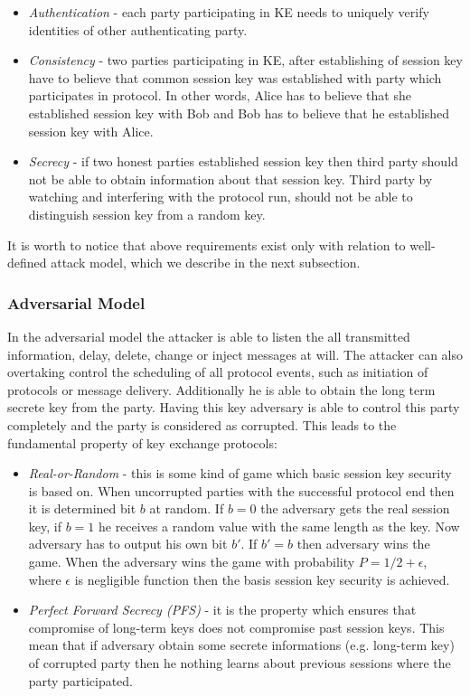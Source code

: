 \documentclass[11pt,titlepage]{article}
\theoremstyle{plain}
\begin{document}
\begin{itemize}
	\item \textit{Authentication} - each party participating in KE needs to uniquely verify identities of other authenticating party.
	\item \textit{Consistency} - two parties participating in KE, after establishing of session key have to believe that common session key was established with party which participates in protocol. In other words, Alice has to believe that she established session key with Bob and Bob has to believe that he established session key with Alice.
	\item \textit{Secrecy} - if two honest parties established session key then third party should not be able to obtain information about that session key. Third party by watching and interfering with the protocol run, should not be able to distinguish session key from a random key.
\end{itemize}

It is worth to notice that above requirements exist only with relation to well-defined attack model, which we describe in the next subsection.

\subsubsection{Adversarial Model}
In the adversarial model the attacker is able to listen the all transmitted information, delay, delete, change or inject messages at will. The attacker can also overtaking control the scheduling of all protocol events, such as initiation of protocols or message delivery. Additionally he is able to obtain the long term secrete key from the party. Having this key adversary is able to  control this party completely and the party is considered as corrupted. This leads to the fundamental property of key exchange protocols:

\begin{itemize}
	\item \textit{Real-or-Random} - this is some kind of game which basic session key security is based on. When uncorrupted parties with the successful protocol end then it is determined bit $b$ at random. If $b=0$ the adversary gets the real session key, if $b = 1$ he receives a random value with the same length as the key. Now adversary has to output his own bit $b'$. If $b' = b$ then adversary wins the game. When the adversary wins the game with probability $P = 1/2+\epsilon$, where $\epsilon$ is negligible function then the basis session key security is achieved.
	\item \textit{Perfect Forward Secrecy (PFS)} - it is the property which ensures that compromise of long-term keys does not compromise past session keys. This mean that if adversary obtain some secrete informations (e.g. long-term key) of corrupted party then he nothing learns about previous sessions where the party participated.
\end{itemize}
\end{document}
